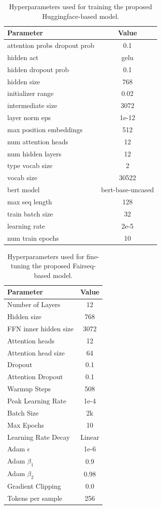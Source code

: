 \begin{table}
\centering
\footnotesize
\begin{tabular}{lc}
\toprule
Parameter & Value \\
\midrule
  attention probs dropout prob & 0.1 \\
  hidden act & gelu \\
  hidden dropout prob & 0.1 \\
  hidden size & 768 \\
  initializer range & 0.02 \\
  intermediate size & 3072 \\
  layer norm eps & 1e-12 \\
  max position embeddings & 512 \\
  num attention heads & 12 \\
  num hidden layers & 12 \\
  type vocab size & 2 \\
  vocab size & 30522 \\
  bert model & bert-base-uncased \\
  max seq length & 128 \\
  train batch size & 32 \\
  learning rate & 2e-5 \\
  num train epochs & 10 \\
  \bottomrule
\end{tabular}
\caption{Hyperparameters  used for training the proposed Huggingface-based \URLTranSysb model.}
\label{tab:urltran:TransParamsBert}
\end{table}

\begin{table}
\centering
\footnotesize
\begin{tabular}{lc}
\toprule
Parameter & Value \\
\midrule
Number of Layers & 12 \\
Hidden size & 768 \\
FFN inner hidden size & 3072 \\
Attention heads & 12 \\
Attention head size & 64 \\
Dropout & 0.1 \\
Attention Dropout & 0.1 \\
Warmup Steps & 508 \\
Peak Learning Rate & 1e-4 \\
Batch Size & 2k \\
Max Epochs & 10 \\
Learning Rate Decay & Linear \\
Adam $\epsilon$ & 1e-6 \\
Adam $\beta_1$ & 0.9 \\
Adam $\beta_2$ & 0.98 \\
Gradient Clipping & 0.0 \\
Tokens per sample & 256 \\
\bottomrule
\end{tabular}
\caption{Hyperparameters used for fine-tuning the proposed Fairseq-based \URLTranSysr model.}
\label{tab:urltran:TransParamsRoberta}
\end{table}

